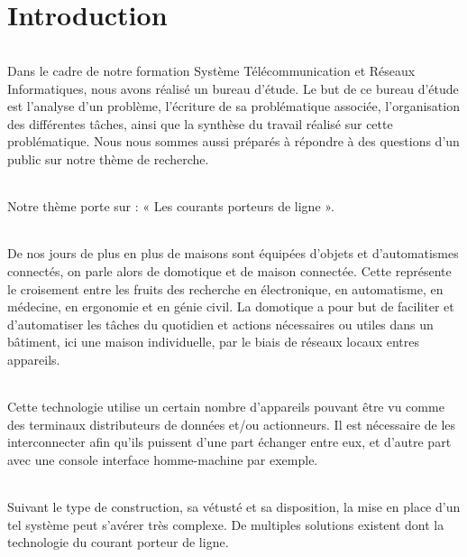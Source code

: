 
\part*{Introduction}
    \paragraph{}
Dans le cadre de notre formation Système Télécommunication et Réseaux Informatiques, nous avons réalisé un bureau d'étude.
Le but de ce bureau d'étude est l'analyse d'un problème, l'écriture de sa problématique associée,
l'organisation des différentes tâches, ainsi que la synthèse du travail réalisé sur cette problématique.
Nous nous sommes aussi préparés à répondre à des questions d'un public sur notre thème de recherche.
    \paragraph{}
Notre thème porte sur : « Les courants porteurs de ligne ».
    \paragraph{}
De nos jours de plus en plus de maisons sont équipées d'objets et d'automatismes connectés, on parle alors de domotique et de maison connectée.
Cette représente le croisement entre les fruits des recherche en électronique, en automatisme, en médecine, en ergonomie et en génie civil.
La domotique a pour but de faciliter et d'automatiser les tâches du quotidien et actions nécessaires ou utiles dans un bâtiment,
ici une maison individuelle, par le biais de réseaux locaux entres appareils.
    \paragraph{}
Cette technologie utilise un certain nombre d'appareils pouvant être vu comme des terminaux distributeurs de données et/ou actionneurs.
Il est nécessaire de les interconnecter afin qu'ils puissent d'une part échanger entre eux,
et d'autre part avec une console interface homme-machine par exemple.
    \paragraph{}
Suivant le type de construction, sa vétusté et sa disposition, la mise en place d'un tel système peut s'avérer très complexe.
De multiples solutions existent dont la technologie du courant porteur de ligne.

    \clearpage


